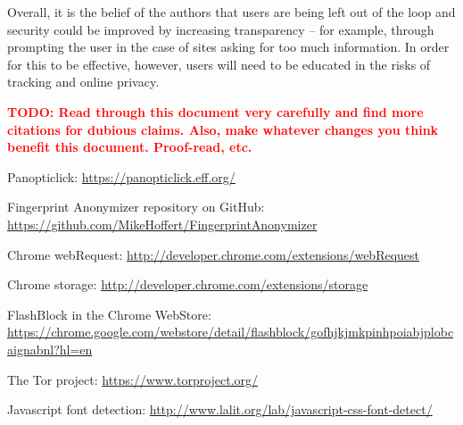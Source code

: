 \documentclass[12pt,a4paper]{article}
\begin{document}
Overall, it is the belief of the authors that users are being left out of the loop and security could be improved by increasing transparency -- for example, through prompting the user in the case of sites asking for too much information. In order for this to be effective, however, users will need to be educated in the risks of tracking and online privacy.

\textcolor{red}{\textbf{TODO: Read through this document very carefully and find more citations for dubious claims. Also, make whatever changes you think benefit this document. Proof-read, etc.}}

\begin{thebibliography}{0}

  Panopticlick: \url{https://panopticlick.eff.org/}

  Fingerprint Anonymizer repository on GitHub: \url{https://github.com/MikeHoffert/FingerprintAnonymizer}

  Chrome webRequest: \url{http://developer.chrome.com/extensions/webRequest}
  
  Chrome storage: \url{http://developer.chrome.com/extensions/storage}
  
  FlashBlock in the Chrome WebStore: \url{https://chrome.google.com/webstore/detail/flashblock/gofhjkjmkpinhpoiabjplobcaignabnl?hl=en}
  
  The Tor project: \url{https://www.torproject.org/}

  Javascript font detection: \url{http://www.lalit.org/lab/javascript-css-font-detect/}

\end{thebibliography}
\end{document}
